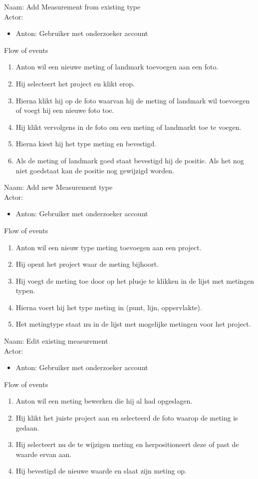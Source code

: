 \item   Naam: Add Measurement from existing type  \\
	Actor:
	\begin{itemize}
		\item Anton: Gebruiker met onderzoeker account
	\end{itemize}
	Flow of events
	\begin{enumerate}
		\item Anton wil een nieuwe meting of landmark toevoegen aan een foto.
		\item Hij selecteert het project en klikt erop.
		\item Hierna klikt hij op de foto waarvan hij de meting of landmark wil toevoegen of voegt hij een nieuwe foto toe.
		\item Hij klikt vervolgens in de foto om een meting of landmarkt toe te voegen.
		\item Hierna kiest hij het type meting en bevestigd.
		\item Als de meting of landmark goed staat bevestigd hij de positie. Als het nog niet goedstaat kan de positie nog gewijzigd worden.
	\end{enumerate}


\item   Naam: Add new Measurement type  \\
	Actor:
	\begin{itemize}
		\item Anton: Gebruiker met onderzoeker account
	\end{itemize}
	Flow of events
	\begin{enumerate}
		\item Anton wil een nieuw type meting toevoegen aan een project.
		\item Hij opent het project waar de meting bijhoort.
		\item Hij voegt de meting toe door op het plusje te klikken in de lijst met metingen typen.
		\item Hierna voert hij het type meting in (punt, lijn, oppervlakte).
		\item Het metingtype staat nu in de lijst met mogelijke metingen voor het project.
	\end{enumerate}


\item   Naam: Edit existing measurement  \\
	Actor:
	\begin{itemize}
		\item Anton: Gebruiker met onderzoeker account
	\end{itemize}
	Flow of events
	\begin{enumerate}
		\item Anton wil een meting bewerken die hij al had opgeslagen.
		\item Hij klikt het juiste project aan en selecteerd de foto waarop de meting is gedaan.
		\item Hij selecteert nu de te wijzigen meting en herpositioneert deze of past de waarde ervan aan.
		\item Hij bevestigd de nieuwe waarde en slaat zijn meting op.
	\end{enumerate}


